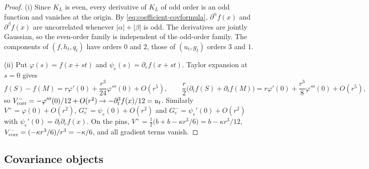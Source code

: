 \begin{proof}
(i) Since $K_L$ is even, every derivative of $K_L$ of odd order is an odd function and vanishes at the origin. By \eqref{eq:coefficient-covformula}, $\partial^\alpha f(x)$ and $\partial^\beta f(x)$ are uncorrelated whenever $|\alpha|+|\beta|$ is odd. The derivatives are jointly Gaussian, so the even-order family is independent of the odd-order family. The components of $(f,h_t,q_t)$ have orders $0$ and $2$, those of $(u_t,g_t)$ orders $3$ and $1$.

(ii) Put $\varphi(s)=f(x+st)$ and $\psi_e(s)=\partial_ef(x+st)$. Taylor expansion at $s=0$ gives
\[
f(S)-f(M)=r\varphi'(0)+\frac{r^3}{24}\varphi'''(0)+O(r^5),\qquad
\frac r2\bigl(\partial_tf(S)+\partial_tf(M)\bigr)=r\varphi'(0)+\frac{r^3}{8}\varphi'''(0)+O(r^5),
\]
so $V^-_{\rm corr}=-\varphi'''(0)/12+O(r^2)\to-\partial_t^3f(x)/12=u_t$. Similarly $V^+=\varphi(0)+O(r^2)$, $G^+_e=\psi_e(0)+O(r^2)$ and $G^-_e=\psi_e'(0)+O(r^2)$ with $\psi_e'(0)=\partial_t\partial_ef(x)$. On the pins, $V^+=\frac12\bigl(b+b-\kappa r^3/6\bigr)=b-\kappa r^3/12$, $V^-_{\rm corr}=(-\kappa r^3/6)/r^3=-\kappa/6$, and all gradient terms vanish.
\end{proof}

\subsection{Covariance objects}\label{ssec:coefficient-cov}

